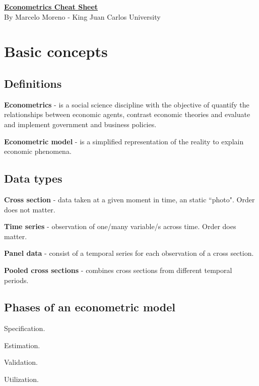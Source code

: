 \documentclass[10pt, a4paper, landscape]{extarticle}
\begin{document}
\setlength{\footskip}{12pt}
\begin{multicols}{3} %

\begin{center}
\textbf{\LARGE \href{https://github.com/marcelomijas/econometrics-cheatsheet}{Econometrics Cheat Sheet}} \\ {\footnotesize By Marcelo Moreno - King Juan Carlos University}
\end{center}

\section*{Basic concepts}
\subsection*{Definitions}

\textbf{Econometrics} - is a social science discipline with the objective of quantify the relationships between economic agents, contrast economic theories and evaluate and implement government and business policies.

\textbf{Econometric model} - is a simplified representation of the reality to explain economic phenomena.

\subsection*{Data types}

\textbf{Cross section} - data taken at a given moment in time, an static ``photo". Order does not matter.

\textbf{Time series} - observation of one/many variable/s across time. Order does matter.

\textbf{Panel data} - consist of a temporal series for each observation of a cross section.

\textbf{Pooled cross sections} - combines cross sections from different temporal periods.

\subsection*{Phases of an econometric model}

\begin{enumerate}[leftmargin=*]
\setlength{\multicolsep}{0pt}
\begin{multicols}{2}
\item Specification.
\item Estimation.
\columnbreak
\item Validation.
\item Utilization.
\end{multicols}
\end{enumerate}


\end{multicols}
\end{document}
